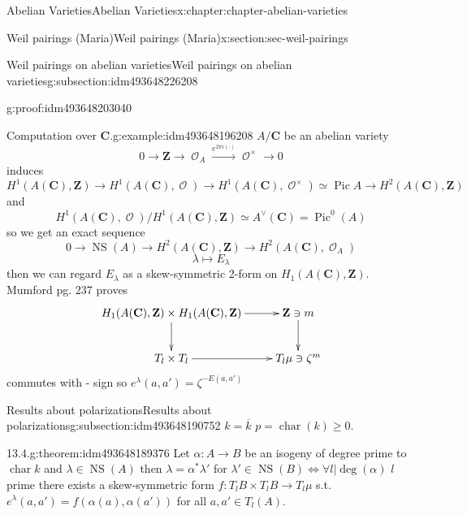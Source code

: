 \documentclass[oneside,10pt,]{book}
\numberwithin{equation}{section}
\newcommand{\sheaf}[1]{\operatorname{\mathcal{#1}}}
\newcommand{\ZZ}{\mathbf{Z}}
\newcommand{\CC}{\mathbf{C}}
\DeclareMathOperator{\Pic}{Pic}
\DeclareMathOperator{\characteristic}{char}
\DeclareMathOperator{\NS}{NS}
\begin{document}
\begin{chapterptx}{Abelian Varieties}{}{Abelian Varieties}{}{}{x:chapter:chapter-abelian-varieties}
\begin{sectionptx}{Weil pairings (Maria)}{}{Weil pairings (Maria)}{}{}{x:section:sec-weil-pairings}
\begin{subsectionptx}{Weil pairings on abelian varieties}{}{Weil pairings on abelian varieties}{}{}{g:subsection:idm493648226208}
\begin{proofptx}{}{g:proof:idm493648203040}
%
\end{proofptx}
\begin{example}{Computation over \(\CC\).}{g:example:idm493648196208}%
\(A/\CC\) be an abelian variety%
\begin{equation*}
0\to \ZZ \to \sheaf O_A \xrightarrow{e^{2\pi i (\cdot)}} \sheaf O^\times \to 0
\end{equation*}
induces%
\begin{equation*}
H^1(A(\CC), \ZZ) \to H^1(A(\CC), \sheaf O) \to H^1(A(\CC), \sheaf O^\times) \simeq \Pic A \to H^2(A(\CC), \ZZ)
\end{equation*}
and%
\begin{equation*}
H^1(A(\CC), \sheaf O)/ H^1(A(\CC), \ZZ) \simeq A^\vee(\CC) = \Pic^0(A)
\end{equation*}
so we get an exact sequence%
\begin{equation*}
0 \to \NS(A) \to H^2 (A(\CC),\ZZ) \to H^2(A(\CC),\sheaf O_A)
\end{equation*}
%
\begin{equation*}
\lambda \mapsto E_\lambda
\end{equation*}
then we can regard \(E_\lambda\) as a skew-symmetric 2-form on \(H_1(A(\CC), \ZZ)\). Mumford pg. 237 proves%
\begin{equation*}
\xymatrix{
H_1(A(\CC), \ZZ) \times H_1(A(\CC), \ZZ) \ar[r] \ar[d] & \ZZ\ni m \ar[d] \\
T_l \times T_l \ar[r] & T_l \mu \ni \zeta^m
}
\end{equation*}
commutes with - sign so \(e^\lambda (a,a') = \zeta^{-E(a,a')}\)%
\end{example}
\end{subsectionptx}
%
%
\typeout{************************************************}
\typeout{************************************************}
%
\begin{subsectionptx}{Results about polarizations}{}{Results about polarizations}{}{}{g:subsection:idm493648190752}
\(k = \overline k\) \(p = \characteristic (k) \ge 0\).%
\begin{theorem}{13.4.}{}{g:theorem:idm493648189376}%
Let \(\alpha\colon A\to B\) be an isogeny of degree prime to \(\characteristic k\) and \(\lambda \in \NS(A)\) then \(\lambda = \alpha^* \lambda '\) for \(\lambda ' \in \NS(B) \iff \forall l |\deg(\alpha)\) \(l\) prime there exists a skew-symmetric form \(f\colon T_lB\times T_lB \to T_l\mu\) s.t. \(e^\lambda(a,a') = f(\alpha(a), \alpha(a'))\) for all \(a,a' \in T_l(A)\).%
\end{theorem}

\end{subsectionptx}
\end{sectionptx}
\end{chapterptx}
\end{document}
